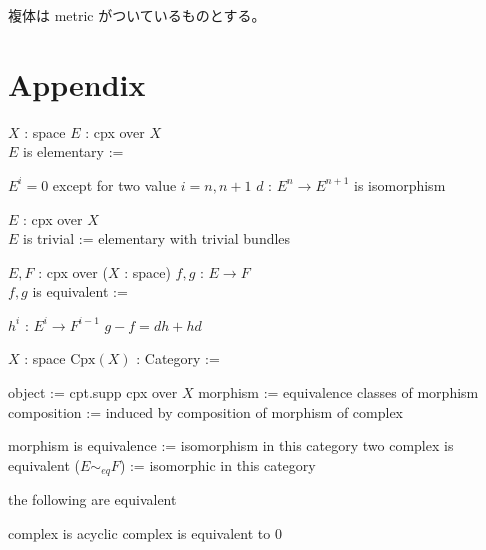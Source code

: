 \documentclass[dvipdfmx]{jsarticle}
\begin{document}
複体は metric がついているものとする。
\section*{Appendix}
\begin{Definition}
\itemwhen \(X\) : space
\itemdefi
  \For \(E\) : cpx over \(X\) \\
  \Define \(E\) is elementary :=
  \begin{itemize}
    \itemwith \(E^i = 0\) except for two value \(i = n, n+1\) 
    \itemwith \(d\) : \(E^n \to E^{n+1}\) is isomorphism 
  \end{itemize}
\itemdefi
  \For \(E\) : cpx over \(X\) \\
  \Define \(E\) is trivial := elementary with trivial bundles
\end{Definition}

\begin{Definition}
\itemwhen \(E,F\) : cpx over (\(X\) : space)
\itemdefi 
  \For \(f,g\) : \(E \to F\) \\
  \Define \(f,g\) is equivalent :=
  \begin{itemize}
    \itemenum \(h^i\) : \(E^i \to F^{i-1}\)
    \itemwith \(g - f = dh + hd\)
  \end{itemize}
\end{Definition}

\newcommand{\CpxCat}[1]{\text{Cpx}(#1)}
\begin{Definition}
\itemwhen \(X\) : space
\itemdefi \(\CpxCat{X}\) : Category :=
  \begin{itemize}
    \itemenum object := cpt.supp cpx over \(X\)
    \itemenum morphism := equivalence classes of morphism
    \itemenum composition := induced by composition of morphism of complex
  \end{itemize}
\itemdefi morphism is equivalence := isomorphism in this category
\itemdefi two complex is equivalent (\(E \sim_{eq} F\)) := isomorphic in this category 
\end{Definition}

\begin{Theorem}
\itemprop the following are equivalent
\begin{itemize}
  \itemwith complex is acyclic
  \itemwith complex is equivalent to \(0\)
\end{itemize}
\end{Theorem}
\end{document}
